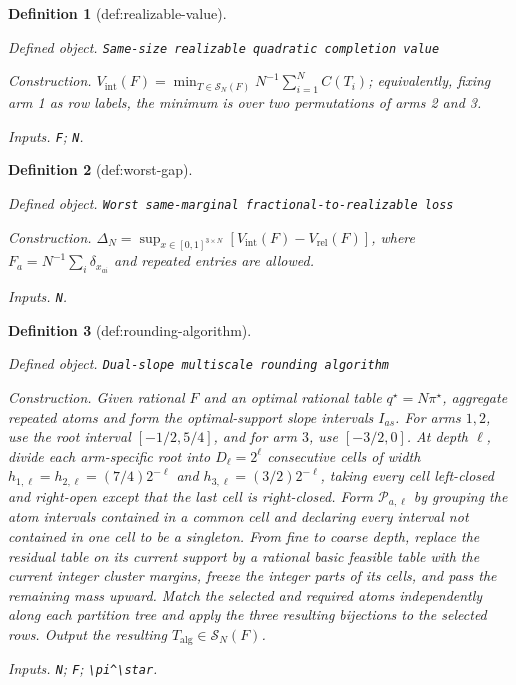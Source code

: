 \documentclass{article}
\newtheorem{definition}{Definition}
\begin{document}
\begin{definition}[def:realizable-value]\label{def:realizable-value}
\par\smallskip\noindent\emph{Defined object.} \texttt{Same-\allowbreak{}size realizable quadratic completion value}
\par\smallskip\noindent\emph{Construction.} \(V_{\mathrm{int}}(F)=\min_{T\in\mathcal S_N(F)}N^{-1}\sum_{i=1}^NC(T_i)\); equivalently, fixing arm 1 as row labels, the minimum is over two permutations of arms 2 and 3.
\par\smallskip\noindent\emph{Inputs.} \texttt{F}; \texttt{N}.
\end{definition}

\begin{definition}[def:worst-gap]\label{def:worst-gap}
\par\smallskip\noindent\emph{Defined object.} \texttt{Worst same-\allowbreak{}marginal fractional-\allowbreak{}to-\allowbreak{}realizable loss}
\par\smallskip\noindent\emph{Construction.} \(\Delta_N=\sup_{x\in[0,1]^{3\times N}}[V_{\mathrm{int}}(F)-V_{\mathrm{rel}}(F)]\), where \(F_a=N^{-1}\sum_i\delta_{x_{ai}}\) and repeated entries are allowed.
\par\smallskip\noindent\emph{Inputs.} \texttt{N}.
\end{definition}

\begin{definition}[def:rounding-algorithm]\label{def:rounding-algorithm}
\par\smallskip\noindent\emph{Defined object.} \texttt{Dual-\allowbreak{}slope multiscale rounding algorithm}
\par\smallskip\noindent\emph{Construction.} Given rational \(F\) and an optimal rational table \(q^\star=N\pi^\star\), aggregate repeated atoms and form the optimal-support slope intervals \(I_{as}\).  For arms \(1,2\), use the root interval \([-1/2,5/4]\), and for arm \(3\), use \([-3/2,0]\).  At depth \(\ell\), divide each arm-specific root into \(D_\ell=2^\ell\) consecutive cells of width \(h_{1,\ell}=h_{2,\ell}=(7/4)2^{-\ell}\) and \(h_{3,\ell}=(3/2)2^{-\ell}\), taking every cell left-closed and right-open except that the last cell is right-closed.  Form \(\mathcal P_{a,\ell}\) by grouping the atom intervals contained in a common cell and declaring every interval not contained in one cell to be a singleton.  From fine to coarse depth, replace the residual table on its current support by a rational basic feasible table with the current integer cluster margins, freeze the integer parts of its cells, and pass the remaining mass upward.  Match the selected and required atoms independently along each partition tree and apply the three resulting bijections to the selected rows.  Output the resulting \(T_{\mathrm{alg}}\in\mathcal S_N(F)\).
\par\smallskip\noindent\emph{Inputs.} \texttt{N}; \texttt{F}; \texttt{\textbackslash{}\allowbreak{}pi\textasciicircum{}\textbackslash{}\allowbreak{}star}.
\end{definition}
\end{document}
